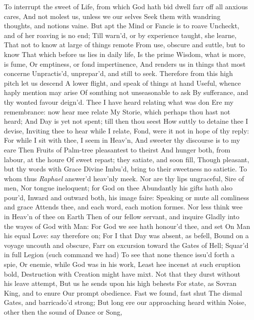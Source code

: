 \documentclass[11pt]{book}
\begin{document}
To interrupt the sweet of Life, from which 
God hath bid dwell farr off all anxious cares, 
And not molest us, unless we our selves 
Seek them with wandring thoughts, and notions vaine. 
But apt the Mind or Fancie is to roave 
Uncheckt, and of her roaving is no end; 
Till warn'd, or by experience taught, she learne, 
That not to know at large of things remote 
From use, obscure and suttle, but to know 
That which before us lies in daily life, 
Is the prime Wisdom, what is more, is fume, 
Or emptiness, or fond impertinence, 
And renders us in things that most concerne 
Unpractis'd, unprepar'd, and still to seek. 
Therefore from this high pitch let us descend 
A lower flight, and speak of things at hand 
Useful, whence haply mention may arise 
Of somthing not unseasonable to ask 
By sufferance, and thy wonted favour deign'd. 
Thee I have heard relating what was don 
Ere my remembrance: now hear mee relate 
My Storie, which perhaps thou hast not heard; 
And Day is yet not spent; till then thou seest 
How suttly to detaine thee I devise, 
Inviting thee to hear while I relate, 
Fond, were it not in hope of thy reply: 
For while I sit with thee, I seem in Heav'n, 
And sweeter thy discourse is to my eare 
Then Fruits of Palm-tree pleasantest to theirst 
And hunger both, from labour, at the houre 
Of sweet repast; they satiate, and soon fill, 
Though pleasant, but thy words with Grace Divine 
Imbu'd, bring to their sweetness no satietie. 
\quad To whom thus \textit{Raphael} answer'd heav'nly meek. 
Nor are thy lips ungraceful, Sire of men, 
Nor tongue ineloquent; for God on thee 
Abundantly his gifts hath also pour'd, 
Inward and outward both, his image faire: 
Speaking or mute all comliness and grace 
Attends thee, and each word, each motion formes. 
Nor less think wee in Heav'n of thee on Earth 
Then of our fellow servant, and inquire 
Gladly into the wayes of God with Man: 
For God we see hath honour'd thee, and set 
On Man his equal Love: say therefore on; 
For I that Day was absent, as befell, 
Bound on a voyage uncouth and obscure, 
Farr on excursion toward the Gates of Hell; 
Squar'd in full Legion (such command we had) 
To see that none thence issu'd forth a spie, 
Or enemie, while God was in his work, 
Least hee incenst at such eruption bold, 
Destruction with Creation might have mixt. 
Not that they durst without his leave attempt, 
But us he sends upon his high behests 
For state, as Sovran King, and to enure 
Our prompt obedience.  Fast we found, fast shut 
The dismal Gates, and barricado'd strong; 
But long ere our approaching heard within 
Noise, other then the sound of Dance or Song, 
\end{document}
